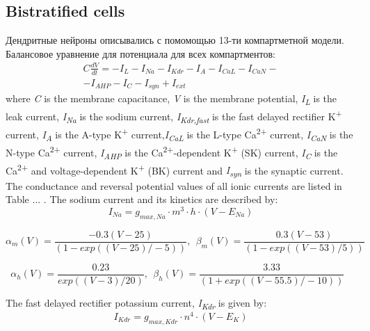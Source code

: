 \documentclass[12pt]{article}
\begin{document}
\bigskip

\subsection{Bistratified cells}
Дендритные нейроны описывались с помомощью 13-ти компартметной модели. Балансовое уравнение для потенциала для всех компартментов:
\begin{eqnarray}
C\frac{dV}{dt}=-I_L-I_{Na}-I_{Kdr}-I_A-I_{CaL}-I_{CaN} - \nonumber \\ -I_{AHP}-I_C-I_{syn}+I_{ext}
\end{eqnarray}
where \textit{C} is the membrane capacitance, \textit{V} is the membrane potential, \textit{I\textsubscript{L}}
is the leak current, \textit{I\textsubscript{Na}} is the sodium current, \textit{I\textsubscript{Kdr,fast}} is the fast delayed rectifier K\textsuperscript{+} current, \textit{I}\textit{\textsubscript{A}} is the A-type K\textsuperscript{+} current,\textit{I\textsubscript{CaL}}
is the L-type Ca\textsuperscript{2+} current, \textit{I}\textit{\textsubscript{CaN}} is the N-type
Ca\textsuperscript{2+} current, \textit{I}\textit{\textsubscript{AHP}} is the Ca\textsuperscript{2+}-dependent
K\textsuperscript{+} (SK) current, \textit{I}\textit{\textsubscript{C}} is the Ca\textsuperscript{2+} and
voltage-dependent K\textsuperscript{+} (BK) current and \textit{I}\textit{\textsubscript{syn}} is the synaptic current.
The conductance and reversal potential values of all ionic currents are listed in Table ... .
The sodium current and its kinetics are described by:
\begin{equation}
I_{Na}=g_{max, Na} \cdot m^3 \cdot h \cdot (V-E_{Na})
\end{equation}

\begin{equation}
\alpha_m(V)=\frac{-0.3(V-25)}{(1-exp((V-25)/-5))}, \ \  \beta_m(V)=\frac{0.3(V-53)}{(1-exp((V-53)/5))} \ 
\end{equation}

\begin{equation}
\alpha_h(V)=\frac{0.23}{exp((V-3)/20)}, \ \  \beta_h(V)=\frac{3.33}{(1+exp((V-55.5)/-10))}\ \ \ 
\end{equation}

The fast delayed rectifier potassium current, \textit{I\textsubscript{Kdr}} is given by:
\begin{equation}
I_{Kdr} = g_{max, Kdr} \cdot n^4 \cdot (V-E_K)
\end{equation}
\end{document}
